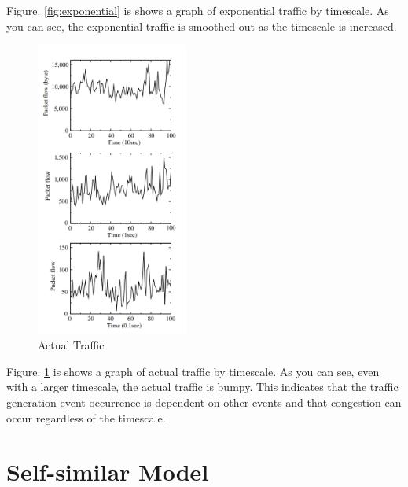 Figure. \ref{fig:exponential} is shows a graph of exponential traffic by timescale.
As you can see, the exponential traffic is smoothed out as the timescale is increased.
\clearpage
  \begin{figure}[!ht]
    \centering
    \includegraphics[width=5cm]{img/actual.png}
    \caption{Actual Traffic \protect \footnotemark}
    \label{fig:actual}  
  \end{figure}

Figure. \ref{fig:actual} is shows a graph of actual traffic by timescale.
As you can see, even with a larger timescale, the actual traffic is bumpy.
This indicates that the traffic generation event occurrence is dependent on other events and that congestion can occur regardless of the timescale.

\section{Self-similar Model}

